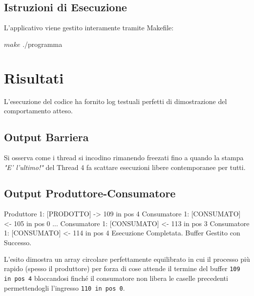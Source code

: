\documentclass[a4paper,12pt]{article}
\begin{document}
\subsection{Istruzioni di Esecuzione}
L'applicativo viene gestito interamente tramite Makefile:
\begin{terminal}
$ make
$ ./programma
\end{terminal}

\section{Risultati}
L'esecuzione del codice ha fornito log testuali perfetti di dimostrazione del comportamento atteso.

\subsection{Output Barriera}
Si osserva come i thread si incodino rimanendo freezati fino a quando la stampa \textit{"E' l'ultimo!"} del Thread 4 fa scattare esecuzioni libere contemporanee per tutti.

\subsection{Output Produttore-Consumatore}
\begin{terminal}
Produttore 1: [PRODOTTO] -> 109 in pos 4
Consumatore 1: [CONSUMATO] <- 105 in pos 0
...
Consumatore 1: [CONSUMATO] <- 113 in pos 3
Consumatore 1: [CONSUMATO] <- 114 in pos 4
Esecuzione Completata. Buffer Gestito con Successo.
\end{terminal}
L'esito dimostra un array circolare perfettamente equilibrato in cui il processo più rapido (spesso il produttore) per forza di cose attende il termine del buffer \texttt{109 in pos 4} bloccandosi finché il consumatore non libera le caselle precedenti permettendogli l'ingresso \texttt{110 in pos 0}. 
\end{document}
